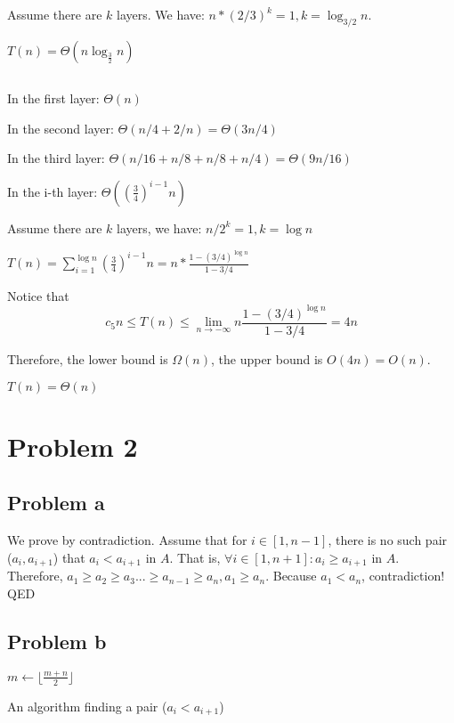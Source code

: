 \documentclass{article}
\begin{document}
Assume there are $k$ layers. We have: $n*(2/3)^k=1, k = \log_{3/2}{n}$.

$T(n) = \Theta(n\log_{\frac{3}{2}}{n})$

\subsection{}
In the first layer: $\Theta(n)$

In the second layer: $\Theta(n/4+2/n) = \Theta(3n/4)$

In the third layer: $\Theta(n/16+n/8+n/8+n/4)=\Theta(9n/16)$

In the i-th layer:
$\Theta((\frac{3}{4})^{i-1}n)$

Assume there are $k$ layers, we have: $n/{2^k}=1, k = \log{n}$

$T(n)=\sum_{i=1}^{\log{n}}(\frac{3}{4})^{i-1}n=n*\frac{1-(3/4)^{\log{n}}}{1-3/4}$

Notice that \[c_5n \leq T(n) \leq \lim_{n \to -\infty}n\frac{1-(3/4)^{\log{n}}}{1-3/4}=4n\]

Therefore, the lower bound is $\Omega(n)$, the upper bound is $O(4n)=O(n)$.

$T(n) = \Theta(n)$

\section{Problem 2}
\subsection{Problem a}
We prove by contradiction. Assume that for $i\in [1,n-1]$, there is no such pair ($a_i, a_{i+1}$) that $a_i < a_{i+1}$ in $A$. That is, $\forall i\in[1,n+1]: a_i \geq a_{i+1}$ in $A$. Therefore, $a_1 \geq a_2 \geq a_3 ... \geq a_{n-1} \geq a_{n}, a_1 \geq a_n$. Because $a_1 < a_n$, contradiction! QED
\subsection{Problem b}
\begin{algorithm}[!ht]
\DontPrintSemicolon
  
  $m \leftarrow \lfloor\frac{m+n}{2}\rfloor$
  
   
  
  

\caption{An algorithm finding a pair ($a_i < a_{i+1}$)}
\end{algorithm}
\end{document}
